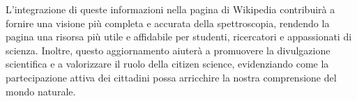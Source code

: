 \documentclass[12pt,a4paper]{report}
\begin{document}
L'integrazione di queste informazioni nella pagina di Wikipedia contribuirà a fornire una visione più completa e accurata della spettroscopia, rendendo la pagina una risorsa più utile e affidabile per studenti, ricercatori e appassionati di scienza. Inoltre, questo aggiornamento aiuterà a promuovere la divulgazione scientifica e a valorizzare il ruolo della citizen science, evidenziando come la partecipazione attiva dei cittadini possa arricchire la nostra comprensione del mondo naturale.

\newpage

\printbibliography
\end{document}
